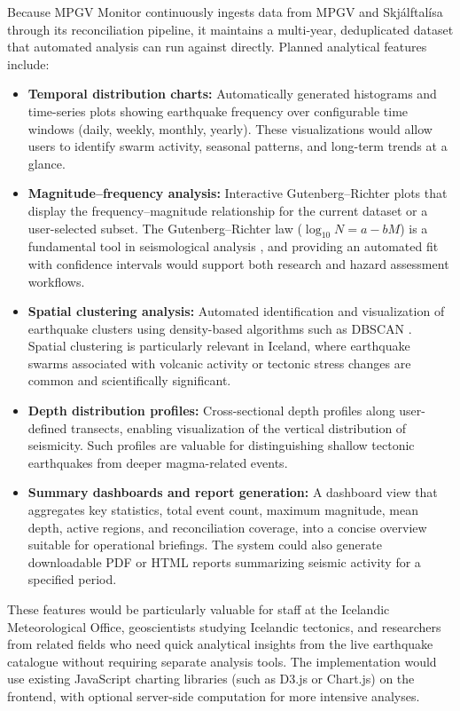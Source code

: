 \documentclass[12pt]{article}
\begin{document}
Because MPGV Monitor continuously ingests data from MPGV and Skjálftalísa through its reconciliation pipeline, it maintains a multi-year, deduplicated dataset that automated analysis can run against directly. Planned analytical features include:

\begin{itemize}
    \item \textbf{Temporal distribution charts:} Automatically generated histograms and time-series plots showing earthquake frequency over configurable time windows (daily, weekly, monthly, yearly). These visualizations would allow users to identify swarm activity, seasonal patterns, and long-term trends at a glance.
    \item \textbf{Magnitude--frequency analysis:} Interactive Gutenberg--Richter plots that display the frequency--magnitude relationship for the current dataset or a user-selected subset. The Gutenberg--Richter law ($\log_{10} N = a - bM$) is a fundamental tool in seismological analysis \cite{GutenbergRichter1944}, and providing an automated fit with confidence intervals would support both research and hazard assessment workflows.
    \item \textbf{Spatial clustering analysis:} Automated identification and visualization of earthquake clusters using density-based algorithms such as DBSCAN \cite{Ester1996DBSCAN}. Spatial clustering is particularly relevant in Iceland, where earthquake swarms associated with volcanic activity or tectonic stress changes are common and scientifically significant.
    \item \textbf{Depth distribution profiles:} Cross-sectional depth profiles along user-defined transects, enabling visualization of the vertical distribution of seismicity. Such profiles are valuable for distinguishing shallow tectonic earthquakes from deeper magma-related events.
    \item \textbf{Summary dashboards and report generation:} A dashboard view that aggregates key statistics, total event count, maximum magnitude, mean depth, active regions, and reconciliation coverage, into a concise overview suitable for operational briefings. The system could also generate downloadable PDF or HTML reports summarizing seismic activity for a specified period.
\end{itemize}

These features would be particularly valuable for staff at the Icelandic Meteorological Office, geoscientists studying Icelandic tectonics, and researchers from related fields who need quick analytical insights from the live earthquake catalogue without requiring separate analysis tools. The implementation would use existing JavaScript charting libraries (such as D3.js or Chart.js) on the frontend, with optional server-side computation for more intensive analyses.
\end{document}
